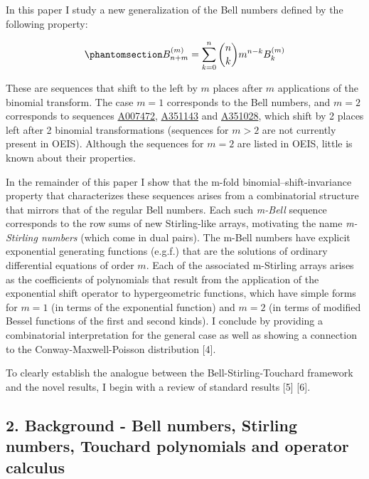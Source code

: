 \documentclass[
  letterpaper,
  DIV=11,
  numbers=noendperiod]{scrartcl}
\begin{document}
In this paper I study a new generalization of the Bell numbers defined
by the following property:

\begin{equation}\phantomsection\label{eq-mbell-recurrence}{
B^{(m)}_{n+m} = \sum_{k=0}^n \binom{n}{k} m^{n-k} B_k^{(m)}
}\end{equation}

These are sequences that shift to the left by \(m\) places after \(m\)
applications of the binomial transform. The case \(m=1\) corresponds to
the Bell numbers, and \(m=2\) corresponds to sequences
\href{https://oeis.org/A007472}{A007472},
\href{https://oeis.org/search?q=1,0,1,2,5,16&language=english&go=Search}{A351143}
and \href{https://oeis.org/A351028}{A351028}, which shift by 2 places
left after 2 binomial transformations (sequences for \(m>2\) are not
currently present in OEIS). Although the sequences for \(m=2\) are
listed in OEIS, little is known about their properties.

In the remainder of this paper I show that the m-fold
binomial--shift-invariance property that characterizes these sequences
arises from a combinatorial structure that mirrors that of the regular
Bell numbers. Each such \emph{m-Bell} sequence corresponds to the row
sums of new Stirling-like arrays, motivating the name \emph{m-Stirling
numbers} (which come in dual pairs). The m-Bell numbers have explicit
exponential generating functions (e.g.f.) that are the solutions of
ordinary differential equations of order \(m\). Each of the associated
m-Stirling arrays arises as the coefficients of polynomials that result
from the application of the exponential shift operator to hypergeometric
functions, which have simple forms for \(m=1\) (in terms of the
exponential function) and \(m=2\) (in terms of modified Bessel functions
of the first and second kinds). I conclude by providing a combinatorial
interpretation for the general case as well as showing a connection to
the Conway-Maxwell-Poisson distribution {[}4{]}.

To clearly establish the analogue between the Bell-Stirling-Touchard
framework and the novel results, I begin with a review of standard
results {[}5{]} {[}6{]}.

\subsection{2. Background - Bell numbers, Stirling numbers, Touchard
polynomials and operator
calculus}\label{background---bell-numbers-stirling-numbers-touchard-polynomials-and-operator-calculus}
\end{document}
